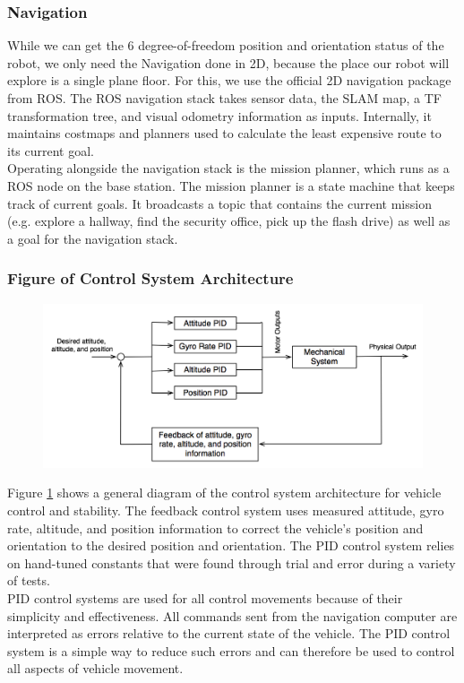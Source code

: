 \documentclass[12pt, letterpaper]{article}
\begin{document}
\subsubsection{Navigation}

While we can get the 6 degree-of-freedom position and orientation status of the robot, we only need the Navigation done in 2D, because the place our robot will explore is a single plane floor. For this, we use the official 2D navigation package from ROS.  The ROS navigation stack takes sensor data, the SLAM map, a TF transformation tree, and visual odometry information as inputs.  Internally, it maintains costmaps and planners used to calculate the least expensive route to its current goal.
\vspace{1.0em}\\
Operating alongside the navigation stack is the mission planner, which runs as a ROS node on the base station.  The mission planner is a state machine that keeps track of current goals.  It broadcasts a topic that contains the current mission (e.g. explore a hallway, find the security office, pick up the flash drive) as well as a goal for the navigation stack.

\subsubsection{Figure of Control System Architecture}

\begin{figure}[h]
\centering
\includegraphics[width=14cm]{images/Control-System-Diagram.png}
\label{fig:controlsystem}
\end{figure}
\noindent
Figure \ref{fig:controlsystem} shows a general diagram of the control system architecture for vehicle control and stability. The feedback control system uses measured attitude, gyro rate, altitude, and position information to correct the vehicle's position and orientation to the desired position and orientation. The PID control system relies on hand-tuned constants that were found through trial and error during a variety of tests. 
\vspace{1.0em}\\
PID control systems are used for all control movements because of their simplicity and effectiveness. All commands sent from the navigation computer are interpreted as errors relative to the current state of the vehicle. The PID control system is a simple way to reduce such errors and can therefore be used to control all aspects of vehicle movement.
\end{document}
